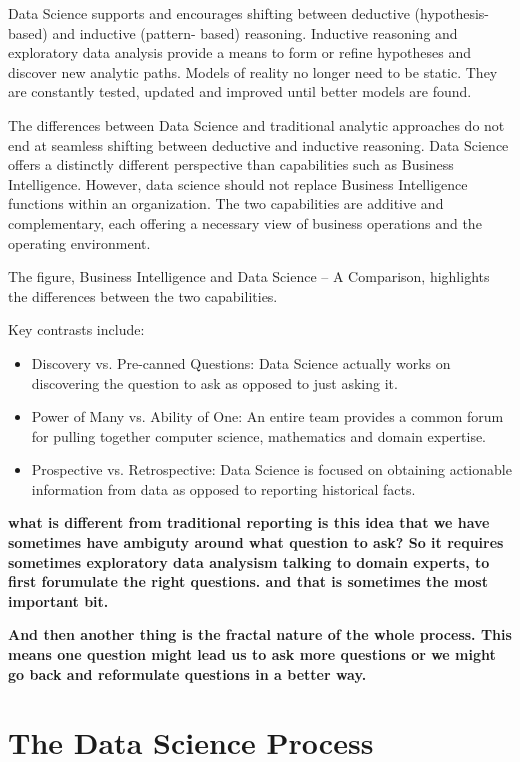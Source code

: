 \documentclass{rapportECL}
\begin{document}
Data Science supports and encourages shifting between deductive (hypothesis-based) and inductive (pattern- based) reasoning. Inductive reasoning and exploratory data analysis provide a means to form or refine hypotheses and discover new analytic paths. Models of reality no longer need to be static. They are constantly tested, updated and improved until better models are found.

The differences between Data Science and traditional analytic approaches do not end at seamless shifting between deductive and inductive reasoning. Data Science offers a distinctly different perspective than capabilities such as Business Intelligence. However, data science should not replace Business Intelligence functions within
an organization. The two capabilities are additive and complementary, each offering a necessary view of business operations and the operating environment. 

The figure, Business Intelligence and Data Science – A Comparison, highlights the differences between the two capabilities. 


Key contrasts include:

\begin{itemize}
    \item Discovery vs. Pre-canned Questions: Data Science actually works on discovering the question to ask as opposed to just asking it.
    \item Power of Many vs. Ability of One: An entire team provides a common forum for pulling together computer science, mathematics and domain expertise.
    \item  Prospective vs. Retrospective: Data Science is focused on obtaining actionable information from data as opposed to reporting historical facts.
\end{itemize}


\textbf{what is different from traditional reporting is this idea that we have sometimes have ambiguty around what question to ask? So it requires sometimes exploratory data analysism talking to domain experts, to first forumulate the right questions. and that is sometimes the most important bit.} 

\textbf{And then another thing is the fractal nature of the whole process. This means one question might lead us to ask more questions or we might go back and reformulate questions in a better way.}


\section{The Data Science Process}
\end{document}
